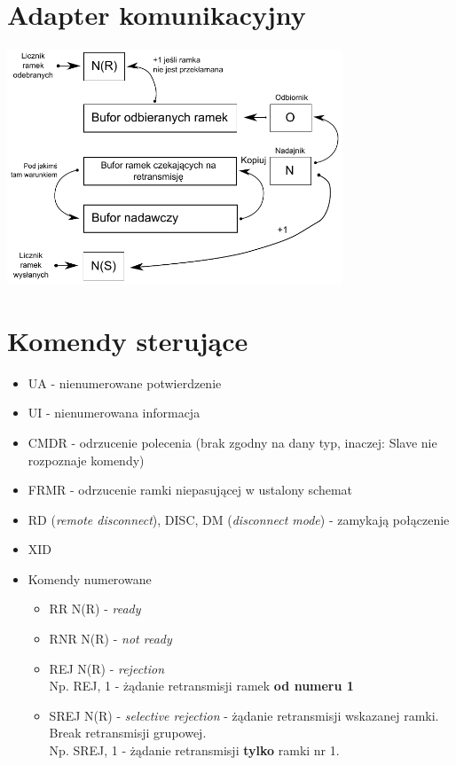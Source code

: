 \documentclass[a4paper,twoside]{article}
\begin{document}
\section{Adapter komunikacyjny}
\includegraphics[width=10cm]{./images/image12.pdf}

\section{Komendy sterujące}
\begin{itemize}
	\item UA - nienumerowane potwierdzenie
	\item UI - nienumerowana informacja
	\item CMDR - odrzucenie polecenia (brak zgodny na dany typ, inaczej: Slave nie rozpoznaje komendy)
	\item FRMR - odrzucenie ramki niepasującej w ustalony schemat
	\item RD (\emph{remote disconnect}), DISC, DM (\emph{disconnect mode}) - zamykają połączenie
	\item XID
	\item Komendy numerowane
	\begin{itemize}
		\item RR N(R) - \emph{ready}
		\item RNR N(R) - \emph{not ready}
		\item REJ N(R) - \emph{rejection}\\
		Np. REJ, 1 - żądanie retransmisji ramek \textbf{od numeru 1}
		\item SREJ N(R) - \emph{selective rejection} - żądanie retransmisji wskazanej ramki. Break retransmisji grupowej.\\
		Np. SREJ, 1 - żądanie retransmisji \textbf{tylko} ramki nr 1.
	\end{itemize}
\end{itemize}
\end{document}
